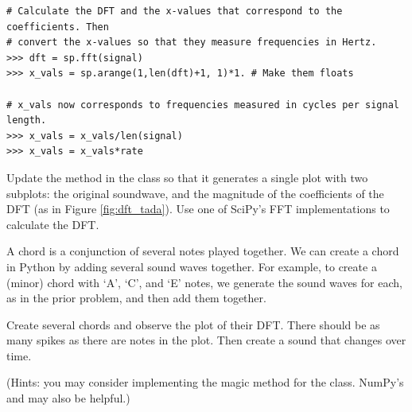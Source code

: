 \begin{lstlisting}
# Calculate the DFT and the x-values that correspond to the coefficients. Then
# convert the x-values so that they measure frequencies in Hertz.
>>> dft = sp.fft(signal)
>>> x_vals = sp.arange(1,len(dft)+1, 1)*1. # Make them floats

# x_vals now corresponds to frequencies measured in cycles per signal length.
>>> x_vals = x_vals/len(signal)
>>> x_vals = x_vals*rate
\end{lstlisting}

\begin{problem}
Update the  method in the  class so that it generates a single plot with two subplots: the original soundwave, and the magnitude of the coefficients of the DFT (as in Figure \ref{fig:dft_tada}).
Use one of SciPy's FFT implementations to calculate the DFT.
\end{problem}

\begin{problem}
A chord is a conjunction of several notes played together.
We can create a chord in Python by adding several sound waves together.
For example, to create a (minor) chord with `A', `C', and `E' notes, we generate the sound waves for each, as in the prior problem, and then add them together.

Create several chords and observe the plot of their DFT.
There should be as many spikes as there are notes in the plot.
Then create a sound that changes over time.

(Hints: you may consider implementing the  magic method for the  class.
NumPy's  and  may also be helpful.)
\end{problem}


